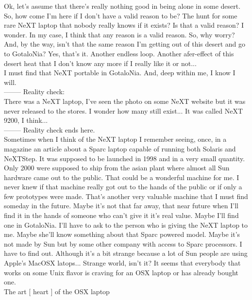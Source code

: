 \documentclass[11pt,twoside,a4paper]{book}
\begin{document}
\begin{multicols*}{2}
Ok, let's assume that there's really nothing good in being alone in some desert. So, how come I'm here if I don't have a valid reason to be? The hunt for some rare NeXT laptop that nobody really knows if it exists? Is that a valid reason? I wonder. In my case, I think that any reason is a valid reason. So, why worry? And, by the way, isn't that the same reason I'm getting out of this desert and go to GotaloNia? Yes, that's it. Another endless loop. Another afer-effect of this desert heat that I don't know any more if I really like it or not... ~\\

I must find that NeXT portable in GotaloNia. And, deep within me, I know I will. ~\\


{\large -------- Reality check:} ~\\
There was a NeXT laptop, I've seen the photo on some NeXT website but it was never released to the stores. I wonder how many still exist... It was called NeXT 9200, I think... ~\\
{\large -------- Reality check ends here.} ~\\

Sometimes when I think of the NeXT laptop I remember seeing, once, in a magazine an article about a Sparc laptop capable of running both Solaris and NeXTStep. It was supposed to be launched in 1998 and in a very small quantity. Only 2000 were supposed to ship from the asian plant where almost all Sun hardware came out to the public. That could be a wonderful machine for me. I never knew if that machine really got out to the hands of the public or if only a few prototypes were made. That's another very valuable machine that I must find someday in the future. Maybe it's not that far away, that near future when I'll find it in the hands of someone who can't give it it's real value. Maybe I'll find one in GotaloNia. I'll have to ask to the person who is giving the NeXT laptop to me. Maybe she'll know something about that Sparc powered model. Maybe it's not made by Sun but by some other company with access to Sparc processors. I have to find out. Although it's a bit strange because a lot of Sun people are using Apple's MacOSX latops... Strange world, isn't it? It seems that everybody that works on some Unix flavor is craving for an OSX laptop or has already bought one. ~\\

{\large The art [ heart ] of the OSX laptop} ~\\


\end{multicols*}
\end{document}
